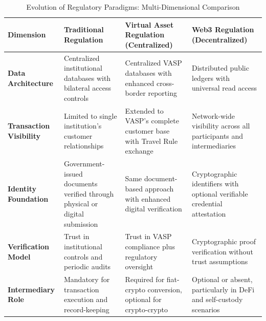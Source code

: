 \documentclass[conference,compsoc]{IEEEtran}
\begin{document}
\begin{table}[t]
\centering
\caption{Evolution of Regulatory Paradigms: Multi-Dimensional Comparison}
\label{tab:regulatory_evolution}
\scriptsize
\begin{tabularx}{\textwidth}{lXXX}
\toprule
\textbf{Dimension} & \textbf{Traditional Regulation} & \textbf{Virtual Asset Regulation (Centralized)} & \textbf{Web3 Regulation (Decentralized)} \\
\midrule
\textbf{Data Architecture} & Centralized institutional databases with bilateral access controls \cite{arner2016fintechregtechreconceptualization} & Centralized VASP databases with enhanced cross-border reporting \cite{force2021updatedguidanceriskbased} & Distributed public ledgers with universal read access \cite{nakamoto2008bitcoinpeertopeerelectronic,buterin2014ethereumnextgenerationsmart} \\
\midrule
\textbf{Transaction Visibility} & Limited to single institution's customer relationships \cite{zetsche2017fintechtechfinregulatory} & Extended to VASP's complete customer base with Travel Rule exchange \cite{force2021opportunitieschallengesnew} & Network-wide visibility across all participants and intermediaries \cite{meiklejohn2013fistfulbitcoinscharacterizing,reid2013analysisanonymitybitcoin} \\
\midrule
\textbf{Identity Foundation} & Government-issued documents verified through physical or digital submission \cite{financialactiontaskforcefatf2012internationalstandardscombating} & Same document-based approach with enhanced digital verification \cite{charoenwong2024regtechtechnologydrivencompliance} & Cryptographic identifiers with optional verifiable credential attestation \cite{reed2022decentralizedidentifiersdids,camenisch2001efficientsystemnontransferable} \\
\midrule
\textbf{Verification Model} & Trust in institutional controls and periodic audits \cite{arner2016fintechregtechreconceptualization} & Trust in VASP compliance plus regulatory oversight \cite{force2021updatedguidanceriskbased} & Cryptographic proof verification without trust assumptions \cite{ben-sasson2017scalablezeroknowledge,zhang2024blockchainzeroknowledge} \\
\midrule
\textbf{Intermediary Role} & Mandatory for transaction execution and record-keeping \cite{financialactiontaskforcefatf2012internationalstandardscombating} & Required for fiat-crypto conversion, optional for crypto-crypto \cite{trautman2014virtualcurrenciesbitcoin} & Optional or absent, particularly in DeFi and self-custody scenarios \cite{harvey2021defifuturefinance,qin2021attackingdefiecosystem} \\

\end{tabularx}
\end{table}
\end{document}
